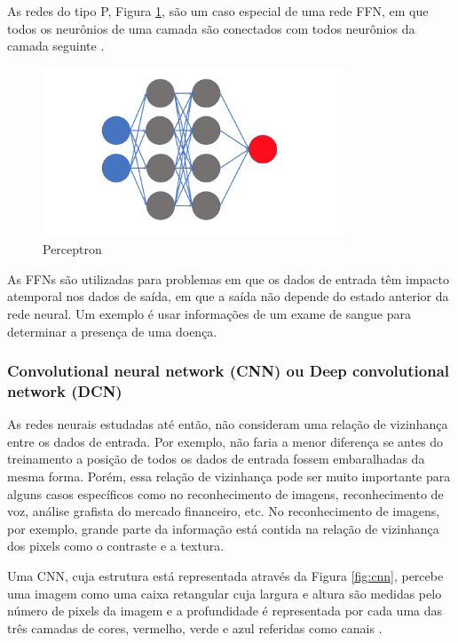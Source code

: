 As redes do tipo P, Figura \ref{fig:perceptron}, são um caso especial de uma rede FFN, em que todos os neurônios de uma camada são conectados com todos neurônios da camada seguinte \cite{alex2020}.

\begin{figure}[H]
    \centering
    \caption{\label{fig:perceptron}Perceptron}
    \includegraphics[width=0.8\textwidth]{img/revisao_bibliografica/perceptron.png}
\end{figure}

As FFNs são utilizadas para problemas em que os dados de entrada têm impacto atemporal nos dados de saída, em que a saída não depende do estado anterior da rede neural. Um exemplo é usar informações de um exame de sangue para determinar a presença de uma doença.

\subsubsection{Convolutional neural network (CNN) ou Deep convolutional network (DCN)}

As redes neurais estudadas até então, não consideram uma relação de vizinhança entre os dados de entrada. Por exemplo, não faria a menor diferença se antes do treinamento a posição de todos os dados de entrada fossem embaralhadas da mesma forma. Porém, essa relação de vizinhança pode ser muito importante para alguns casos específicos como no reconhecimento de imagens, reconhecimento de voz, análise grafista do mercado financeiro, etc. No reconhecimento de imagens, por exemplo, grande parte da informação está contida na relação de vizinhança dos pixels como o contraste e a textura.

Uma CNN, cuja estrutura está representada através da Figura \ref{fig:cnn}, percebe uma imagem como uma caixa retangular cuja largura e altura são medidas pelo número de pixels da imagem e a profundidade é representada por cada uma das três camadas de cores, vermelho, verde e azul referidas como canais \cite{veen2016}.

